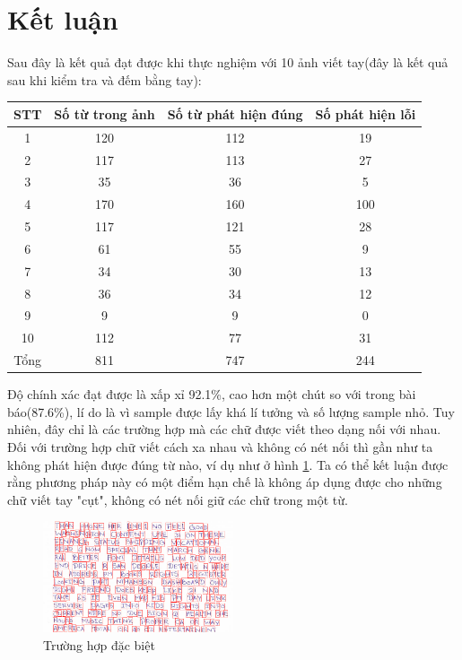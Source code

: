 \documentclass[a4paper]{article}
\begin{document}
\section{Kết luận}
Sau đây là kết quả đạt được khi thực nghiệm với 10 ảnh viết tay(đây là kết quả sau khi kiểm tra và đếm bằng tay):
\begin{center}
    \begin{tabular}{|c|c|c|c|} 
        \hline
        STT & Số từ trong ảnh & Số từ phát hiện đúng & Số phát hiện lỗi \\ 
        \hline
        1 & 120 & 112 & 19 \\
        \hline
        2 & 117 & 113 & 27 \\
        \hline
        3 & 35 & 36 & 5 \\ 
        \hline
        4 & 170 & 160 & 100 \\ 
        \hline
        5 & 117 & 121 & 28 \\ 
        \hline
        6 & 61 & 55 & 9 \\ 
        \hline
        7 & 34 & 30 & 13 \\ 
        \hline
        8 & 36 & 34 & 12 \\ 
        \hline
        9 & 9 & 9 & 0 \\ 
        \hline
        10 & 112 & 77 & 31 \\ 
        \hline
        Tổng & 811 & 747 & 244 \\ 
        \hline
    \end{tabular}
\end{center}
Độ chính xác đạt được là xấp xỉ 92.1\%, cao hơn một chút so với trong bài báo(87.6\%), lí do là vì sample được lấy khá lí tưởng và số lượng sample nhỏ.
Tuy nhiên, đây chỉ là các trường hợp mà các chữ được viết theo dạng nối với nhau. Đối với trường hợp chữ viết cách xa nhau và không có nét nối thì gần như ta không phát hiện được đúng từ nào, ví dụ như ở hình \ref{fig:fig7}.
Ta có thể kết luận được rằng phương pháp này có một điểm hạn chế là không áp dụng được cho những chữ viết tay "cụt", không có nét nối giữ các chữ trong một từ.
\begin{figure}
    \centering
    \includegraphics[width=0.5\textwidth]{failure.png}
    \caption{Trường hợp đặc biệt}
    \label{fig:fig7}
\end{figure}


\label{sec:4}
\end{document}
